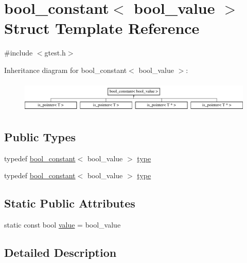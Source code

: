\hypertarget{structtesting_1_1internal_1_1bool__constant}{\section{bool\-\_\-constant$<$ bool\-\_\-value $>$ \-Struct \-Template \-Reference}
\label{d3/d75/structtesting_1_1internal_1_1bool__constant}
}


{\ttfamily \#include $<$gtest.\-h$>$}

\-Inheritance diagram for bool\-\_\-constant$<$ bool\-\_\-value $>$\-:\begin{figure}[H]
\begin{center}
\leavevmode
\includegraphics[height=1.521739cm]{d3/d75/structtesting_1_1internal_1_1bool__constant}
\end{center}
\end{figure}
\subsection*{\-Public \-Types}
\begin{DoxyCompactItemize}
\item 
typedef \hyperlink{structtesting_1_1internal_1_1bool__constant}{bool\-\_\-constant}$<$ bool\-\_\-value $>$ \hyperlink{structtesting_1_1internal_1_1bool__constant_a78018012842840cbf67b94799d759ef7}{type}
\item 
typedef \hyperlink{structtesting_1_1internal_1_1bool__constant}{bool\-\_\-constant}$<$ bool\-\_\-value $>$ \hyperlink{structtesting_1_1internal_1_1bool__constant_a78018012842840cbf67b94799d759ef7}{type}
\end{DoxyCompactItemize}
\subsection*{\-Static \-Public \-Attributes}
\begin{DoxyCompactItemize}
\item 
static const bool \hyperlink{structtesting_1_1internal_1_1bool__constant_a11ddd051208250c32dc4985abcafa86d}{value} = bool\-\_\-value
\end{DoxyCompactItemize}


\subsection{\-Detailed \-Description}
